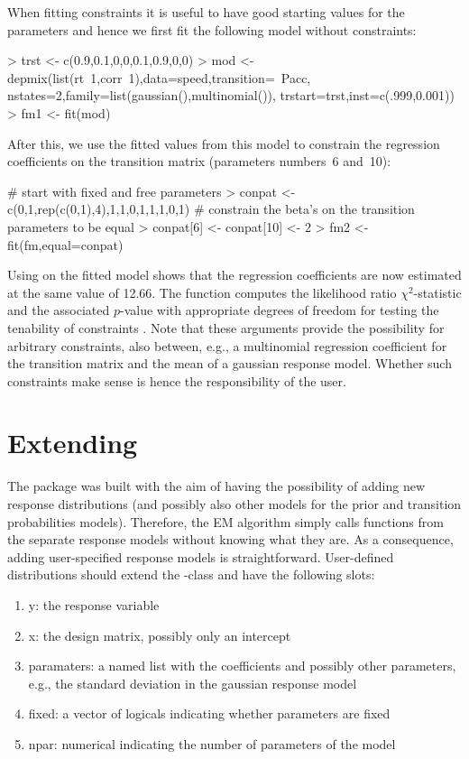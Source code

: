 \documentclass[article]{jss}
\begin{document}
When fitting constraints it is useful to have good starting values 
for the parameters and hence we first fit the following model without
constraints:
\begin{CodeChunk}
\begin{CodeInput}
> trst <- c(0.9,0.1,0,0,0.1,0.9,0,0)
> mod <- depmix(list(rt~1,corr~1),data=speed,transition=~Pacc,
	  nstates=2,family=list(gaussian(),multinomial()),
	  trstart=trst,inst=c(.999,0.001))
> fm1 <- fit(mod)
\end{CodeInput}
\end{CodeChunk}
After this, we use the fitted values from this model to constrain the 
regression coefficients on the transition matrix (parameters numbers~6 and~10):
\begin{CodeChunk}
\begin{CodeInput}
# start with fixed and free parameters
> conpat <- c(0,1,rep(c(0,1),4),1,1,0,1,1,1,0,1)
# constrain the beta's on the transition parameters to be equal
> conpat[6] <- conpat[10] <- 2
> fm2 <- fit(fm,equal=conpat)
\end{CodeInput}
\end{CodeChunk}
Using  on the fitted model shows that the regression 
coefficients are now estimated at the same value of 12.66. The function
 computes the likelihood ratio $\chi^2$-statistic and the
associated $p$-value with appropriate degrees of freedom for testing the
tenability of constraints \citep{Dannemann2007}. Note that these arguments 
provide the possibility for arbitrary 
constraints, also between, e.g., a multinomial regression coefficient 
for the transition matrix and the mean of a gaussian response model. 
Whether such constraints make sense is hence the responsibility of 
the user. 

\section[Extending depmixS4]{Extending }

The  package was built with the aim of having the 
possibility of adding new response distributions (and possibly also 
other models for the prior and transition probabilities models). 
Therefore, the EM algorithm simply calls  functions from the 
separate response models without knowing what they are. As a 
consequence, adding user-specified response models is straightforward. 
User-defined distributions should extend the -class 
and have the following slots:
\begin{enumerate}
	\item y: the response variable
	\item x: the design matrix, possibly only an intercept
	\item paramaters: a named list with the coefficients and possibly 
	other parameters, e.g., the standard deviation in the gaussian 
	response model
	\item fixed: a vector of logicals indicating whether parameters are 
	fixed
	\item npar: numerical indicating the number of parameters of the model
\end{enumerate}
\end{document}
